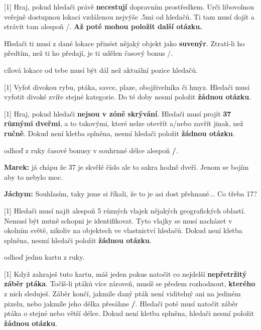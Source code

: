 \begin{cards}
	 Hraj, pokud hledači právě \textbf{necestují} dopravním prostředkem. Urči libovolnou veřejně dostupnou lokaci vzdálenou nejvýše \dist.5mi od hledačů. Ti tam musí dojít a strávit tam alespoň \timecursetravelvisit/. \textbf{Až poté mohou položit další otázku.}

	Hledači ti musí z dané lokace přinést nějaký objekt jako \textbf{suvenýr}. Ztratí-li ho předtím, než ti ho předají, je ti udělen časový bonus \timecursetravelpenalty/.

	\cost cílová lokace od tebe musí být dál než aktuální pozice hledačů.

	 Vyfoť divokou rybu, ptáka, savce, plaze, obojživelníka či hmyz. Hledači musí vyfotit divoké zvíře stejné kategorie. Do té doby nesmí položit \textbf{žádnou otázku}.

	 Hraj, pokud hledači \textbf{nejsou v zóně skrývání}. Hledači musí projít \textbf{37 různými dveřmi}, a to takovými, které nelze otevřít a/nebo zavřít jinak, než \textbf{ručně}. Dokud není kletba splněna, nesmí hledači položit \textbf{žádnou otázku}.

	\cost odhoď z ruky časové bonusy v souhrnné délce alespoň \textbf{\timecursefellowshipcost/}.

	\begin{reasoning}
		\textbf{Marek:} já chápu že 37 je skvělé číslo ale to sakra hodně dveří. Jenom se bojím aby to nebylo moc.

		\textbf{Jáchym:} Souhlasím, taky jsme si říkali, že to je asi dost přehnané... Co třeba 17?
	\end{reasoning}


	 Hledači musí najít alespoň 5 různých vlajek nějakých geografických oblastí. Nemusí být nutně schopni je identifikovat. Tyto vlajky se musí nacházet v okolním světě, nikoliv na objektech ve vlastnictví hledačů. Dokud není kletba splněna, nesmí hledači položit \textbf{žádnou otázku}.

	\cost odhoď jednu kartu z ruky.

	 Když zahraješ tuto kartu, máš jeden pokus natočit co nejdelší \textbf{nepřetržitý záběr ptáka}. Točíš-li ptáků více zároveň, musíš se předem rozhodnout, \textbf{kterého} z nich sleduješ. Záběr končí, jakmile daný pták není viditelný ani na jediném pixelu, nebo jakmile jeho délka přesáhne \textbf{\timecursebirdguide/}. Hledači poté musí natočit záběr ptáka o stejné nebo větší délce. Dokud není kletba splněna, hledači nesmí položit \textbf{žádnou otázku}.


\end{cards}

